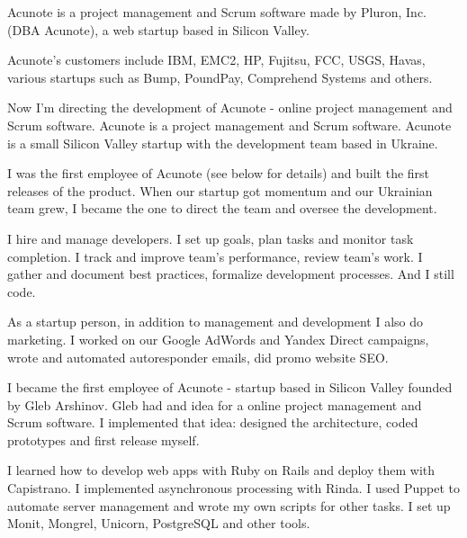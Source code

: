\documentclass[12pt]{letter}
\begin{document}
\begin{llist}
  \startexperience

           \item Acunote is a project management and Scrum software made by Pluron, Inc.
           (DBA Acunote), a web startup based in Silicon Valley.

           \item Acunote's customers include IBM, EMC2, HP, Fujitsu, FCC, USGS, Havas,
           various startups such as Bump, PoundPay, Comprehend Systems and others.

           \item Now I'm directing the development of Acunote - online project management and Scrum software. Acunote is a project management and Scrum software. Acunote is a small Silicon Valley startup with the development team based in Ukraine.

           \item I was the first employee of Acunote (see below for details) and built the first releases of the product. When our startup got momentum and our Ukrainian team grew, I became the one to direct the team and oversee the development.

           \item I hire and manage developers. I set up goals, plan tasks and monitor task completion. I track and improve team's performance, review team's work. I gather and document best practices, formalize development processes. And I still code.

           \item As a startup person, in addition to management and development I also do marketing. I worked on our Google AdWords and Yandex Direct campaigns, wrote and automated autoresponder emails, did promo website SEO.

  \endexperience


  \startexperience

           \item I became the first employee of Acunote - startup based in Silicon Valley founded by Gleb Arshinov. Gleb had and idea for a online project management and Scrum software. I implemented that idea: designed the architecture, coded prototypes and first release myself.

           \item I learned how to develop web apps with Ruby on Rails and deploy them with Capistrano. I implemented asynchronous processing with Rinda. I used Puppet to automate server management and wrote my own scripts for other tasks. I set up Monit, Mongrel, Unicorn, PostgreSQL and other tools.


\end{llist}
\end{document}
